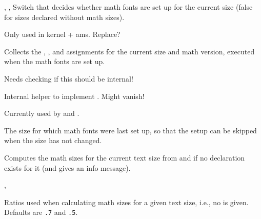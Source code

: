 \documentclass{l3in2edoc}
\begin{document}
\begin{function}[int]
  {
    \ifmath@fonts,
    \math@fontsfalse,
    \math@fontstrue
  }
  Switch that decides whether math fonts are set up for the current
  size (false for sizes declared without math sizes).

  Only used in kernel + ams. Replace?
\end{function}


\begin{function}[int]
  {
    \math@fonts
  }
  Collects the , , and
   assignments for the current size and math
  version, executed when the math fonts are set up.

  Needs checking if this should be internal!
\end{function}






\begin{function}[int]
  {
    \@DeclareMathSizes
  }
  Internal helper to implement . Might vanish!

  Currently used by  and
  .
\end{function}



\begin{function}[int]
  {
    \curr@math@size
  }
  The size for which math fonts were last set up, so that the setup
  can be skipped when the size has not changed.
\end{function}





\begin{function}[]
  {
    \calculate@math@sizes
  }
  Computes the math sizes for the current text size from
   and  if no
   declaration exists for it (and gives an info
  message).
\end{function}


\begin{function}[]
  {
    ,
  }

  Ratios used when calculating math sizes for a given text size, i.e.,
  no  is given. Defaults are \texttt{.7} and
  \texttt{.5}.
\end{function}
\end{document}
